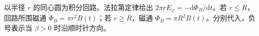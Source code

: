 以半径 $r$ 的同心圆为积分回路。法拉第定律给出 $2\pi rE_\varphi=-\mathrm d\Phi_B/\mathrm dt$。若 $r\le R$，回路所围磁通 $\Phi_B=\pi r^2B(t)$；若 $r\ge R$，磁通 $\Phi_B=\pi R^2B(t)$。分别代入，负号表示当 $\beta>0$ 时沿顺时针方向。
